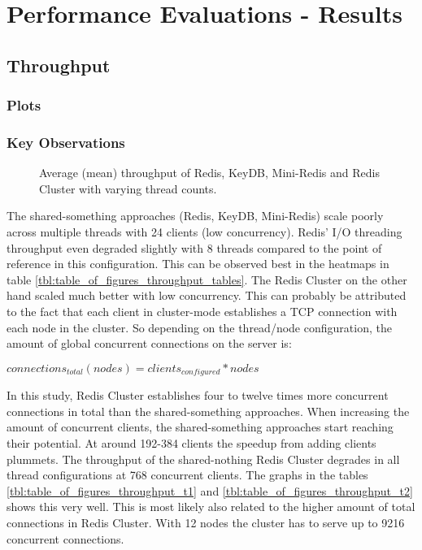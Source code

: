 \chapter{Performance Evaluations - Results}

\section{Throughput}

\subsection{Plots}

\pagebreak

\subsection{Key Observations}
\begin{figure}
    \centering
    \scalebox{0.5}{}
    \caption{Average (mean) throughput of Redis, KeyDB, Mini-Redis and Redis Cluster with varying thread counts.}
    \label{fig:avg_throughput}
\end{figure}
The shared-something approaches (Redis, KeyDB, Mini-Redis) scale poorly across multiple threads with 24 clients (low concurrency). Redis’ I/O threading throughput even degraded slightly with 8 threads compared to the point of reference in this configuration. This can be observed best in the heatmaps in table \ref{tbl:table_of_figures_throughput_tables}. The Redis Cluster on the other hand scaled much better with low concurrency. This can probably be attributed to the fact that each client in cluster-mode establishes a TCP connection with each node in the cluster. So depending on the thread/node configuration, the amount of global concurrent connections on the server is:\newline
\centerline{$connections_{total}(nodes) = clients_{configured} * nodes$}
In this study, Redis Cluster establishes four to twelve times more concurrent connections in total than the shared-something approaches. \newline
When increasing the amount of concurrent clients, the shared-something approaches start reaching their potential. At around 192-384 clients the speedup from adding clients plummets. The throughput of the shared-nothing Redis Cluster degrades in all thread configurations at 768 concurrent clients. The graphs in the tables \ref{tbl:table_of_figures_throughput_t1} and \ref{tbl:table_of_figures_throughput_t2} shows this very well. This is most likely also related to the higher amount of total connections in Redis Cluster. With 12 nodes the cluster has to serve up to 9216 concurrent connections. \newline
